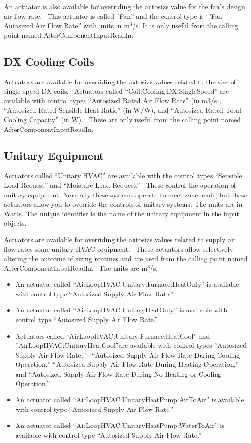 An actuator is also available for overriding the autosize value for the fan's design air flow rate.~ This actuator is called ``Fan'' and the control type is ``'Fan Autosized Air Flow Rate'' with units in m\(^{3}\)/s. It is only useful from the calling point named AfterComponentInputReadIn.

\subsection{DX Cooling Coils}\label{dx-cooling-coils}

Actuators are available for overriding the autosize values related to the size of single speed DX coils.~ Actuators called ``Coil:Cooling:DX:SingleSpeed'' are available with control types ``Autosized Rated Air Flow Rate'' (in m3/s), ``Autosized Rated Sensible Heat Ratio'' (in W/W), and ``Autosized Rated Total Cooling Capacity'' (in W).~ These are only useful from the calling point named AfterComponentInputReadIn.

\subsection{Unitary Equipment}\label{unitary-equipment}

Actuators called ``Unitary HVAC'' are available with the control types ``Sensible Load Request'' and ``Moisture Load Request.''~ These control the operation of unitary equipment. Normally these systems operate to meet zone loads, but these actuators allow you to override the controls of unitary systems. The units are in Watts. The unique identifier is the name of the unitary equipment in the input objects.

Actuators are available for overriding the autosize values related to supply air flow rates some unitary HVAC equipment.~ These actuators allow selectively altering the outcome of sizing routines and are used from the calling point named AfterComponentInputReadIn.~ The units are m\(^{3}\)/s.

\begin{itemize}
\item
  An actuator called ``AirLoopHVAC:Unitary:Furnace:HeatOnly'' is available with control type ``Autosized Supply Air Flow Rate.''
\item
  An actuator called ``AirLoopHVAC:UnitaryHeatOnly'' is available with control type ``Autosized Supply Air Flow Rate.''
\item
  Actuators called ``AirLoopHVAC:Unitary:Furnace:HeatCool'' and ``AirLoopHVAC:UnitaryHeatCool''are available with control types ``Autosized Supply Air Flow Rate,''~ ``Autosized Supply Air Flow Rate During Cooling Operation,'' ``Autosized Supply Air Flow Rate During Heating Operation,'' and ``Autosized Supply Air Flow Rate During No Heating or Cooling Operation.''
\item
  An actuator called ``AirLoopHVAC:UnitaryHeatPump:AirToAir'' is available with control type ``Autosized Supply Air Flow Rate.''
\item
  An actuator called ``AirLoopHVAC:UnitaryHeatPump:WaterToAir'' is available with control type ``Autosized Supply Air Flow Rate.''
\end{itemize}

